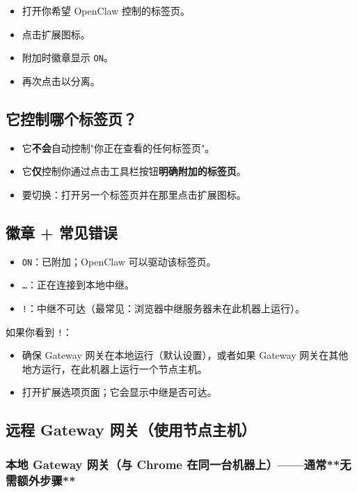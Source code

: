 \begin{itemize}
  \item 打开你希望 OpenClaw 控制的标签页。
  \item 点击扩展图标。
  \item 附加时徽章显示 \texttt{ON}。
  \item 再次点击以分离。
\end{itemize}


\subsection{它控制哪个标签页？}


\begin{itemize}
  \item 它\textbf{不会}自动控制"你正在查看的任何标签页"。
  \item 它\textbf{仅}控制你通过点击工具栏按钮\textbf{明确附加的标签页}。
  \item 要切换：打开另一个标签页并在那里点击扩展图标。
\end{itemize}


\subsection{徽章 + 常见错误}


\begin{itemize}
  \item \texttt{ON}：已附加；OpenClaw 可以驱动该标签页。
  \item \texttt{…}：正在连接到本地中继。
  \item \texttt{!}：中继不可达（最常见：浏览器中继服务器未在此机器上运行）。
\end{itemize}


如果你看到 \texttt{!}：

\begin{itemize}
  \item 确保 Gateway 网关在本地运行（默认设置），或者如果 Gateway 网关在其他地方运行，在此机器上运行一个节点主机。
  \item 打开扩展选项页面；它会显示中继是否可达。
\end{itemize}


\subsection{远程 Gateway 网关（使用节点主机）}


\subsubsection{本地 Gateway 网关（与 Chrome 在同一台机器上）——通常**无需额外步骤**}


